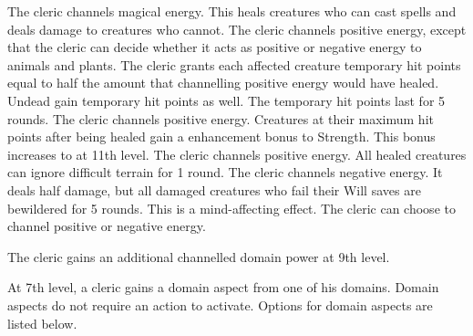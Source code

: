  The cleric channels magical energy. This heals creatures who can cast spells and deals damage to creatures who cannot.
 The cleric channels positive energy, except that the cleric can decide whether it acts as positive or negative energy to animals and plants.
 The cleric grants each affected creature temporary hit points equal to half the amount that channelling positive energy would have healed. Undead gain temporary hit points as well. The temporary hit points last for 5 rounds.
 The cleric channels positive energy. Creatures at their maximum hit points after being healed gain a  enhancement bonus to Strength. This bonus increases to  at 11th level.
 The cleric channels positive energy. All healed creatures can ignore difficult terrain for 1 round.
 The cleric channels negative energy. It deals half damage, but all damaged creatures who fail their Will saves are bewildered for 5 rounds. This is a mind-affecting effect.
 The cleric can choose to channel positive or negative energy.

\par The cleric gains an additional channelled domain power at 9th level.

 At 7th level, a cleric gains a domain aspect from one of his domains. Domain aspects do not require an action to activate. Options for domain aspects are listed below.

